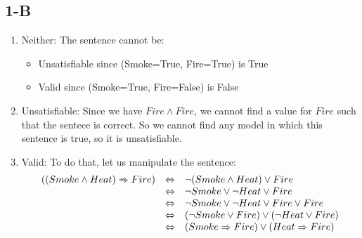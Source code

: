 \documentclass{article}
\begin{document}
        \subsection{1-B}
            \begin{enumerate}
                \item Neither: The sentence cannot be:
                    \begin{itemize}
                        \item Unsatisfiable since (Smoke=True, Fire=True) is True
                        \item Valid since (Smoke=True, Fire=False) is False
                    \end{itemize}
                \item Unsatisfiable: Since we have $Fire\land Fire$, we cannot find a value for $Fire$ such that the sentece is correct. So we cannot find any model in which this sentence is true, so it is unsatisfiable.
                \item Valid: To do that, let us manipulate the sentence:\\
                    \[\begin{array}{r c l}
                            ((Smoke\land Heat)\Rightarrow Fire) & \Leftrightarrow & \lnot (Smoke\land Heat)\lor Fire\\
                            &\Leftrightarrow&\lnot Smoke \lor \lnot Heat \lor Fire\\
                            &\Leftrightarrow&\lnot Smoke \lor \lnot Heat \lor Fire \lor Fire\\
                            &\Leftrightarrow&(\lnot Smoke \lor Fire) \lor (\lnot Heat \lor Fire)\\
                            &\Leftrightarrow& (Smoke \Rightarrow Fire)\lor(Heat\Rightarrow Fire)\\
                    \end{array}\]
            \end{enumerate}
\end{document}
